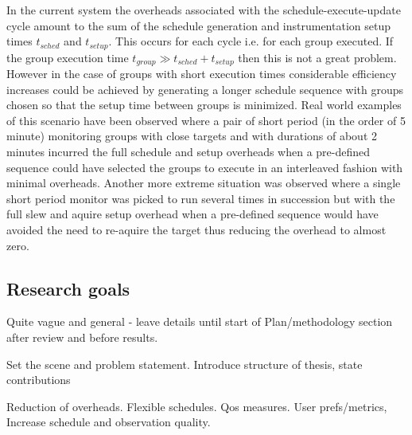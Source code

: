 In the current system the overheads associated with the schedule-execute-update cycle amount to the sum of the schedule generation and instrumentation setup times $t_{sched}$ and $t_{setup}$. This occurs for each cycle i.e. for each group executed. If the group execution time $t_{group} \gg t_{sched}+t_{setup}$ then this is not a great problem. However in the case of groups with short execution times considerable efficiency increases could be achieved by generating a longer schedule sequence with groups chosen so that the setup time between groups is minimized. Real world examples of this scenario have been observed where a pair of short period (in the order of 5 minute) monitoring groups with close targets and with durations of about 2 minutes incurred the full schedule and setup overheads when a pre-defined sequence could have selected the groups to execute in an interleaved fashion with minimal overheads. Another more extreme situation was observed where a single short period monitor was picked to run several times in succession but with the full slew and aquire setup overhead when a pre-defined sequence would have avoided the need to re-aquire the target thus reducing the overhead to almost zero.

\subsection{Research goals}
Quite vague and general - leave details until start of Plan/methodology section after review and before results.

Set the scene and problem statement. Introduce structure of thesis, state contributions 

Reduction of overheads. Flexible schedules. Qos measures. User prefs/metrics, Increase schedule and observation quality. 

